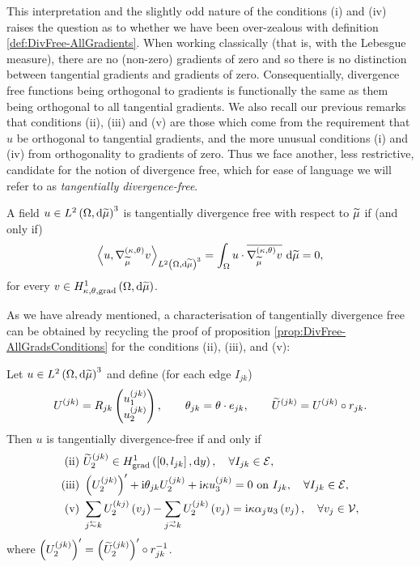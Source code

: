 This interpretation and the slightly odd nature of the conditions (i) and (iv) raises the question as to whether we have been over-zealous with definition \ref{def:DivFree-AllGradients}.
When working classically (that is, with the Lebesgue measure), there are no (non-zero) gradients of zero and so there is no distinction between tangential gradients and gradients of zero.
Consequentially, divergence free functions being orthogonal to gradients is functionally the same as them being orthogonal to all tangential gradients.
We also recall our previous remarks that conditions (ii), (iii) and (v) are those which come from the requirement that $u$ be orthogonal to tangential gradients, and the more unusual conditions (i) and (iv) from orthogonality to gradients of zero. 
Thus we face another, less restrictive, candidate for the notion of divergence free, which for ease of language we will refer to as \emph{tangentially divergence-free}.
\begin{definition} \label{def:DivFree-TangGradients}
	A field $u\in L^{2}\left( \Omega,\mathrm{d} \widetilde{\mu} \right)^3$ is tangentially divergence free with respect to $\widetilde{\mu}$ if (and only if)
	\begin{align*}
		\left\langle u , \nabla^{\left( \kappa, \theta \right)}_{\widetilde{\mu}}v \right\rangle_{L^{2}\left( \Omega,\mathrm{d} \widetilde{\mu} \right)^3} = \int_{\Omega} u\cdot\overline{\nabla^{\left( \kappa, \theta \right)}_{\widetilde{\mu}}v}  \ \mathrm{d}\widetilde{\mu} = 0,
	\end{align*}
	for every $v\in H^1_{\kappa,\theta,\mathrm{grad}}\left( \Omega, \mathrm{d}\widetilde{\mu} \right)$.
\end{definition}
As we have already mentioned, a characterisation of tangentially divergence free can be obtained by recycling the proof of proposition \ref{prop:DivFree-AllGradsConditions} for the conditions (ii), (iii), and (v):
\begin{cory} \label{cory:DivFree-TangGradsConditions}
	Let $u\in L^{2}\left( \Omega,\mathrm{d} \widetilde{\mu} \right)^3$ and define (for each edge $I_{jk}$)
	\begin{align*}
		U^{(jk)} = R_{jk}\begin{pmatrix} u_1^{(jk)} \\ u_2^{(jk)} \end{pmatrix}, 
		\qquad \theta_{jk} = \theta\cdot e_{jk}, 
		\qquad \widetilde{U}^{(jk)} = U^{(jk)}\circ r_{jk}.
	\end{align*}		
	Then $u$ is tangentially divergence-free if and only if
	\begin{align*}
		\mathrm{(ii)} \ & \widetilde{U}_2^{(jk)}\in\gradSob{\sqbracs{0,l_{jk}}}{y}, \quad \forall I_{jk}\in\edgeSet, \\
		\mathrm{(iii)} \ & \bracs{U_2^{(jk)}}' + \rmi\qm_{jk}U_2^{(jk)} + \rmi\wavenumber u_3^{(jk)} = 0 \text{ on } I_{jk}, \quad \forall I_{jk}\in\edgeSet, \\
		\mathrm{(v)} \ & \sum_{j\conRight k}U_2^{(kj)}\bracs{v_j} - \sum_{j\conLeft k}U_2^{(jk)}\bracs{v_j} = \rmi\wavenumber\alpha_j u_3\bracs{v_j}, \quad \forall v_j\in\vertSet,
	\end{align*}
	where $\left( U_2^{(jk)} \right)' = \left( \widetilde{U}_2^{(jk)} \right)'\circ r_{jk}^{-1}$.
\end{cory}
